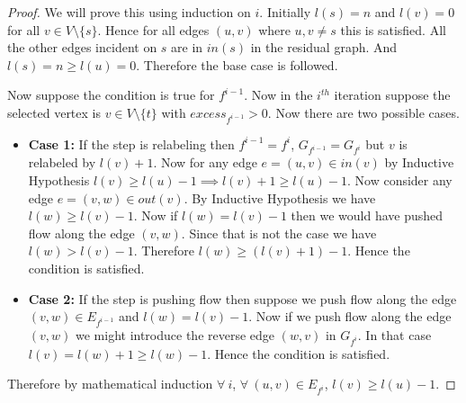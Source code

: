 \begin{proof}
	We will prove this using induction on $i$. Initially $l(s)=n$ and $l(v)=0$ for all $v\in V\setminus\{s\}$. Hence for all edges $(u,v)$ where $u,v\neq s$ this is satisfied. All the other edges incident on $s$ are in $\textit{in}(s)$ in the residual graph. And $l(s)=n\geq l(u)=0$. Therefore the base case is followed. 
	
	Now suppose the condition is true for $f^{i-1}$. Now in the $i^{th}$ iteration   suppose the selected vertex is $v\in V\setminus\{t\}$ with $\textit{excess}_{f^{i-1}}>0$. Now there are two possible cases.\begin{itemize}[label=$\bullet$]
		\item \textbf{Case 1:} If the step is relabeling then $f^{i-1}=f^i$, $G_{f^{i-1}}=G_{f^i}$ but $v$ is relabeled by $l(v)+1$. Now for any edge $e=(u,v)\in \textit{in}(v)$ by Inductive Hypothesis $l(v)\geq l(u)-1\implies l(v)+1\geq l(u)-1$. Now consider any edge $e=(v,w)\in \textit{out}(v)$.  By Inductive Hypothesis we have $l(w)\geq l(v)-1$. Now if $l(w)=l(v)-1$ then we would have pushed flow along the edge $(v,w)$. Since that is not the case we have $l(w)>l(v)-1$. Therefore $l(w)\geq (l(v)+1)-1$. Hence the condition is satisfied.
		\item \textbf{Case 2:} If the step is pushing flow then suppose we push flow along the edge $(v,w)\in E_{f^{i-1}}$ and $l(w)=l(v)-1$. Now if we push flow along the edge $(v,w)$ we might introduce the reverse edge $(w,v)$ in $G_{f^i}$. In that case $l(v)=l(w)+1\geq l(w)-1$. Hence the condition is satisfied.
	\end{itemize}
Therefore by mathematical induction $\forall\ i$, $\forall \ (u,v)\in E_{f^i}$, $l(v)\geq l(u)-1$.
\end{proof}

